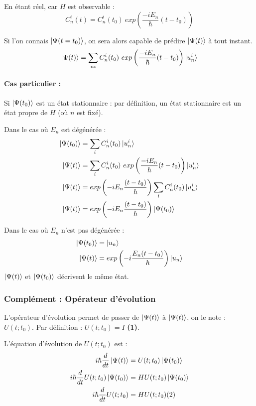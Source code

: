 \documentclass[12pt,a4paper,titlepage]{book}
\begin{document}
En étant réel, car $H$ est observable :
\begin{equation*}
C_n^i (t) = C_n^i (t_0) ~exp \left( \frac{-iE_n}{\hbar} (t-t_0) \right)
\end{equation*}

Si l'on connais $\ket{\Psi (t=t_0)}$, on sera alors capable de prédire $\ket{\Psi (t)}$ à tout instant.
\begin{equation*}
\ket{\Psi (t)} = \sum\limits_{n i} C_n^i (t_0) ~exp \left( \frac{-iE_n}{\hbar} (t-t_0) \right) \ket{u_n^i}
\end{equation*}

\paragraph*{Cas particulier :}

Si $\ket{\Psi (t_0)}$ est un état stationnaire : par définition, un état stationnaire est un état propre de $H$ (où $n$ est fixé).

Dans le cas où $E_n$ est dégénérée :
\begin{align*}
\ket{\Psi (t_0)} &= \sum\limits_i C_n^i (t_0) \ket{u_n^i}\\
\ket{\Psi (t)} &= \sum\limits_i C_n^i (t_0) ~exp\left( \frac{-i E_n}{\hbar} (t-t_0) \right) \ket{u_n^i}\\
\ket{\Psi (t)} &= exp \left( -i E_n \frac{(t-t_0)}{\hbar} \right) \sum\limits_i C_n^i (t_0) \ket{u_n^i}\\
\ket{\Psi (t)} &= exp \left( -i E_n \frac{(t-t_0)}{\hbar} \right) \ket{\Psi (t_0)}
\end{align*}

Dans le cas où $E_n$ n'est pas dégénérée :
\begin{align*}
\ket{\Psi (t_0)} &= \ket{u_n}\\
\ket{\Psi (t)} &= exp \left(-i \frac{E_n (t-t_0)}{\hbar} \right) \ket{u_n}
\end{align*}
$\ket{\Psi (t)}$ et $\ket{\Psi (t_0)}$ décrivent le même état.

\subsubsection{Complément : Opérateur d'évolution}

L'opérateur d'évolution permet de passer de $\ket{\Psi (t)}$ à $\ket{\Psi (t)}$, on le note : $U(t ; t_0)$. Par définition : $U(t ; t_0) = I$ \textbf{(1)}.

L'équation d'évolution de $U(t ; t_0)$ est :
\begin{align*}
i \hbar \frac{d}{dt} \ket{\Psi (t)} &= U(t ; t_0) \ket{\Psi (t_0)}\\
i \hbar \frac{d}{dt} U(t ; t_0) \ket{\Psi (t_0)} &= HU (t ; t_0) \ket{\Psi (t_0)}\\
i \hbar \frac{d}{dt} U (t ; t_0) &= HU (t ; t_0) (2)
\end{align*}
\end{document}
